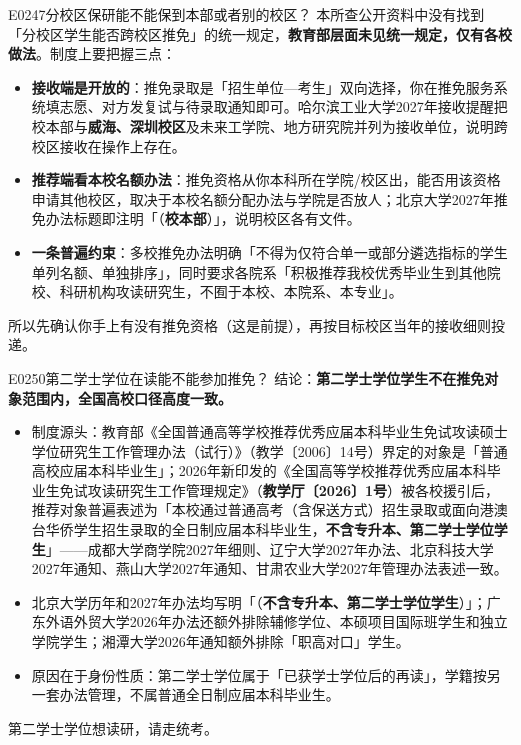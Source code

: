 \begin{qa}{E0247}{分校区保研能不能保到本部或者别的校区？}
本所查公开资料中没有找到「分校区学生能否跨校区推免」的统一规定，\textbf{教育部层面未见统一规定，仅有各校做法}。制度上要把握三点：
\begin{itemize}
  \item \textbf{接收端是开放的}：推免录取是「招生单位—考生」双向选择，你在推免服务系统填志愿、对方发复试与待录取通知即可。哈尔滨工业大学2027年接收提醒把校本部与\textbf{威海、深圳校区}及未来工学院、地方研究院并列为接收单位，说明跨校区接收在操作上存在。
  \item \textbf{推荐端看本校名额办法}：推免资格从你本科所在学院/校区出，能否用该资格申请其他校区，取决于本校名额分配办法与学院是否放人；北京大学2027年推免办法标题即注明「（\textbf{校本部}）」，说明校区各有文件。
  \item \textbf{一条普遍约束}：多校推免办法明确「不得为仅符合单一或部分遴选指标的学生单列名额、单独排序」，同时要求各院系「积极推荐我校优秀毕业生到其他院校、科研机构攻读研究生，不囿于本校、本院系、本专业」。
\end{itemize}
所以先确认你手上有没有推免资格（这是前提），再按目标校区当年的接收细则投递。
\end{qa}

\begin{qa}{E0250}{第二学士学位在读能不能参加推免？}
结论：\textbf{第二学士学位学生不在推免对象范围内，全国高校口径高度一致。}
\begin{itemize}
  \item 制度源头：教育部《全国普通高等学校推荐优秀应届本科毕业生免试攻读硕士学位研究生工作管理办法（试行）》（教学〔2006〕14号）界定的对象是「普通高校应届本科毕业生」；2026年新印发的《全国高等学校推荐优秀应届本科毕业生免试攻读研究生工作管理规定》（\textbf{教学厅〔2026〕1号}）被各校援引后，推荐对象普遍表述为「本校通过普通高考（含保送方式）招生录取或面向港澳台华侨学生招生录取的全日制应届本科毕业生，\textbf{不含专升本、第二学士学位学生}」——成都大学商学院2027年细则、辽宁大学2027年办法、北京科技大学2027年通知、燕山大学2027年通知、甘肃农业大学2027年管理办法表述一致。
  \item 北京大学历年和2027年办法均写明「（\textbf{不含专升本、第二学士学位学生}）」；广东外语外贸大学2026年办法还额外排除辅修学位、本硕项目国际班学生和独立学院学生；湘潭大学2026年通知额外排除「职高对口」学生。
  \item 原因在于身份性质：第二学士学位属于「已获学士学位后的再读」，学籍按另一套办法管理，不属普通全日制应届本科毕业生。
\end{itemize}
第二学士学位想读研，请走统考。
\end{qa}


